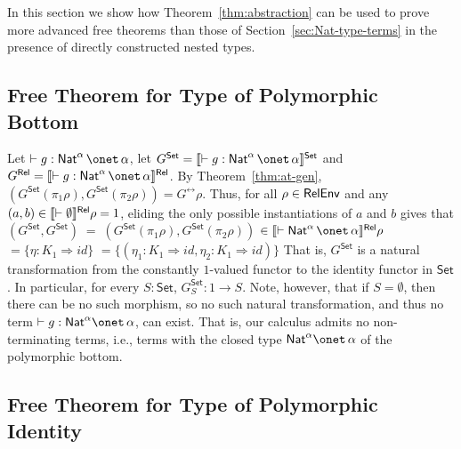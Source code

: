 \documentclass[runningheads]{llncs}
\newcommand{\set}{\mathsf{Set}}
\renewcommand{\id}{\mathit{id}}
\renewcommand{\id}{\mathit{id}}
\begin{document}
In this section we show how Theorem~\ref{thm:abstraction} can be used
to prove more advanced free theorems than those of
Section~\ref{sec:Nat-type-terms} in the presence of directly
constructed nested types.

\subsection{Free Theorem for Type of Polymorphic
  Bottom}\label{sec:bottom} 

Let $ \vdash g : \Nat^\alpha \,\onet\,\alpha$, let $G^\set =
\setsem{\vdash g : \Nat^\alpha \,\onet\,\alpha}$ and $G^\rel =
\relsem{\vdash g : \Nat^\alpha \,\onet\,\alpha}$.  By
Theorem~\ref{thm:at-gen}, $(G^\set(\pi_1\rho),G^\set(\pi_2\rho))
= G^\rel\rho$. Thus, for all $\rho \in \mathsf{RelEnv}$ and any $(a, b) \in
\llbracket{\vdash \emptyset}\rrbracket^{\mathsf{Rel}}\rho = 1$, eliding the only possible
instantiations of $a$ and $b$ gives that
$(G^\set,G^\set) \;= \; (G^\set(\pi_1 \rho), G^\set (\pi_2 \rho))$
$ \in  \relsem{\vdash \Nat^\alpha \,\onet\,\alpha}\rho$
$ =  \{\eta : K_1 \Rightarrow \id\}$
$ =  \{(\eta_1 : K_1 \Rightarrow \id, \eta_2 : K_1 \Rightarrow
\id)\}$ 
That is, $G^\set$ is a natural transformation from the constantly
$1$-valued functor to the identity functor in $\set$. In particular,
for every $S : \set$, $G^\set_S : 1 \to S$. Note, however, that if $S
= \emptyset$, then there can be no such morphism, so no such natural
transformation,
and thus no term $\vdash g : \Nat^\alpha \onet \,\alpha$, can exist.
That is, our calculus admits no non-terminating terms, i.e., terms
with the closed type $\Nat^\alpha \onet \,\alpha$ of the polymorphic
bottom.

\subsection{Free Theorem for Type of Polymorphic
  Identity}\label{sec:identity} 
\end{document}
